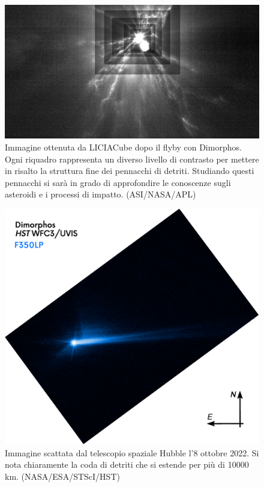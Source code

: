 \documentclass[a4paper,11pt,openright]{book}
\begin{document}
\begin{figure}
    \centering
    \includegraphics[width=\textwidth]{figure/liciacube_impact_tot.jpg}
    \caption[Immagine ottenuta da LICIACube dopo il flyby con Dimorphos.]{Immagine ottenuta da LICIACube dopo il flyby con Dimorphos. Ogni riquadro rappresenta un diverso livello di contrasto per mettere in risalto la struttura fine dei pennacchi di detriti. Studiando questi pennacchi si sarà in grado di approfondire le conoscenze sugli asteroidi e i processi di impatto. (ASI/NASA/APL)}
    \label{fig:liciacube_impact_tot}
\end{figure}

\begin{figure}
    \centering
    \includegraphics[scale=0.25]{figure/hst_plume.png}
    \caption[Immagine della coda di detriti scattata da HST.]{Immagine scattata dal telescopio spaziale Hubble l'8 ottobre 2022. Si nota chiaramente la coda di detriti che si estende per più di 10000 km. (NASA/ESA/STScI/HST)}
    \label{fig:hst_plume}
\end{figure}
\end{document}
